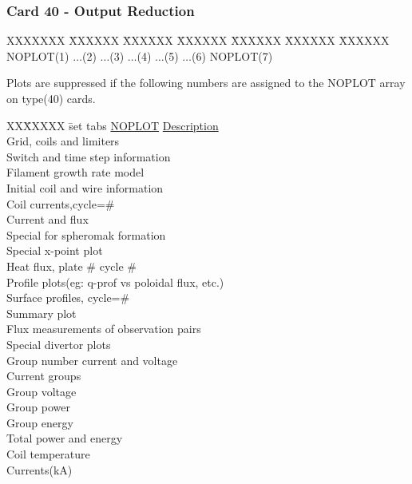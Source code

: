 \newpage \subsubsection{Card 40 - Output Reduction}
\begin{tabbing}
XXXXXXX \= XXXXXX \= XXXXXX \= XXXXXX \= XXXXXX \= XXXXXX \=
XXXXXX       \\
\footnotesize NOPLOT(1) \>\footnotesize $\ldots$(2) \>\footnotesize $\ldots$(3) \>\footnotesize
$\ldots$(4) \>\footnotesize $\ldots$(5) \>\footnotesize $\ldots$(6) \>\footnotesize NOPLOT(7)\\
\end{tabbing}
Plots are suppressed if the following numbers are assigned to the NOPLOT array on type(40) cards.
\begin{tabbing}
XX\= XXXXX \= set tabs \kill
\underline{NOPLOT} \> \>  \underline{Description} \\
 \> Grid, coils and limiters \\
 \> Switch and time step information\\
 \> Filament growth rate model\\
 \> Initial coil and wire information\\
 \> Coil currents,cycle=\#\\
 \> Current and flux\\
  \> Special for spheromak formation \\
 \> Special x-point plot\\
 \> Heat flux, plate \# cycle \#\\
 \> Profile plots(eg: q-prof vs poloidal flux, etc.)\\
 \> Surface profiles, cycle=\#\\
 \> Summary plot\\
 \> Flux measurements of observation pairs\\
 \> Special divertor plots\\
 \> Group number current and voltage\\
 \> Current groups\\
 \> Group voltage\\
 \> Group power\\
 \> Group energy\\
 \> Total power and energy\\
 \> Coil temperature\\
 \> Currents(kA)\\

\end{tabbing}
